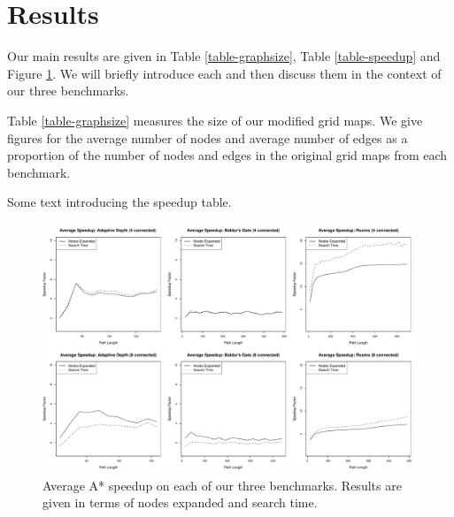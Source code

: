 \section{Results}
\label{sec-results}
Our main results are given in Table \ref{table-graphsize}, Table
\ref{table-speedup} and Figure \ref{fig-speedup}.
We will briefly introduce each and then discuss them in the context
of our three benchmarks.
\par
Table \ref{table-graphsize} measures the size of our modified grid maps.
We give figures for the average number of nodes and average number of edges
as a proportion of the number of nodes and edges in the original grid maps
from each benchmark.




Some text introducing the speedup table.



\begin{figure}[t]
       \begin{center}
                       \includegraphics[width=1.95\columnwidth, trim = 10mm 10mm 10mm 0mm]{diagrams/speedup.pdf}
       \end{center}
       \caption{Average A* speedup on each of our three benchmarks. 
		Results are given in terms of nodes expanded and search time.}
\label{fig-speedup}
\end{figure}

